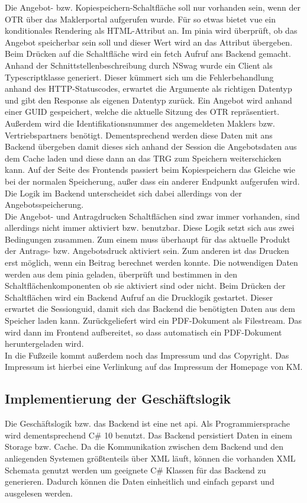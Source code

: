 Die Angebot- bzw. Kopiespeichern-Schaltfläche soll nur vorhanden sein, wenn der \ac{OTR} über das Maklerportal aufgerufen wurde. Für so etwas bietet \gls{vue} ein konditionales Rendering als \gls{HTML}-Attribut an. Im \gls{pinia} wird überprüft, ob das Angebot speicherbar sein soll und dieser Wert wird an das Attribut übergeben. Beim Drücken auf die Schaltfläche wird ein \gls{fetch} Aufruf ans Backend gemacht. Anhand der Schnittstellenbeschreibung durch \gls{NSwag} wurde ein Client als Typescriptklasse generiert. Dieser kümmert sich um die Fehlerbehandlung anhand des \gls{HTTP}-Statuscodes, erwartet die Argumente als richtigen Datentyp und gibt den Response als eigenen Datentyp zurück. Ein Angebot wird anhand einer \ac{GUID} gespeichert, welche die aktuelle Sitzung des \ac{OTR} repräsentiert. Außerdem wird die Identifikationsnummer des angemeldeten Maklers bzw. Vertriebspartners benötigt. Dementsprechend werden diese Daten mit ans Backend übergeben damit dieses sich anhand der Session die Angebotsdaten aus dem Cache laden und diese dann an das \ac{TRG} zum Speichern weiterschicken kann. Auf der Seite des Frontends passiert beim Kopiespeichern das Gleiche wie bei der normalen Speicherung, außer dass ein anderer Endpunkt aufgerufen wird. Die Logik im Backend unterscheidet sich dabei allerdings von der Angebotsspeicherung.\\

Die Angebot- und Antragdrucken Schaltflächen sind zwar immer vorhanden, sind allerdings nicht immer aktiviert bzw. benutzbar. Diese Logik setzt sich aus zwei Bedingungen zusammen. Zum einem muss überhaupt für das aktuelle Produkt der Antrags- bzw. Angebotsdruck aktiviert sein. Zum anderen ist das Drucken erst möglich, wenn ein Beitrag berechnet werden konnte. Die notwendigen Daten werden aus dem \gls{pinia} geladen, überprüft und bestimmen in den Schaltflächenkomponenten ob sie aktiviert sind oder nicht. Beim Drücken der Schaltflächen wird ein Backend Aufruf an die Drucklogik gestartet. Dieser erwartet die Sessionguid, damit sich das Backend die benötigten Daten aus dem Speicher laden kann. Zurückgeliefert wird ein PDF-Dokument als Filestream. Das wird dann im Frontend aufbereitet, so dass automatisch ein PDF-Dokument heruntergeladen wird.\\
In die Fußzeile kommt außerdem noch das Impressum und das Copyright. Das Impressum ist hierbei eine Verlinkung auf das Impressum der Homepage von \ac{KM}.
\subsection{Implementierung der Geschäftslogik}
\label{geschaeftslogikimplementieren}
Die Geschäftslogik bzw. das Backend ist eine \gls{net} \gls{api}. Als Programmiersprache wird dementsprechend C\# 10 benutzt. Das Backend persistiert Daten in einem Storage bzw. Cache.  Da die Kommunikation zwischen dem Backend und den anliegenden Systemen größtenteils über XML läuft, können die vorhanden XML Schemata genutzt werden um geeignete C\# Klassen für das Backend zu generieren. Dadurch können die Daten einheitlich und einfach geparst und ausgelesen werden.\\

